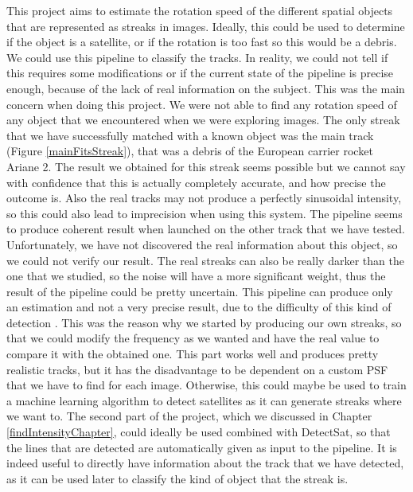 \documentclass[a4paper,12pt,oneside]{report}
\begin{document}
This project aims to estimate the rotation speed of the different spatial objects that are represented as streaks in images. Ideally,
this could be used to determine if the object is a satellite, or if the rotation is too fast so this would be a debris. We could use 
this pipeline to classify the tracks.
\newline
\newline
In reality, we could not tell if this requires some modifications or if the current state of the pipeline is precise enough, because of 
the lack of real information on the subject. This was the main concern when doing this project. We were not able to find any rotation speed of any object that we encountered when we were
exploring images. The only streak that we have successfully matched with a known object was the main track (Figure \ref{mainFitsStreak}),
that was a debris of the European carrier rocket Ariane 2. The result we obtained for this streak seems possible but we cannot say
with confidence that this is actually completely accurate, and how precise the outcome is. Also the real tracks may not produce a perfectly sinusoidal intensity, so this could also lead
to imprecision when using this system. The pipeline seems to produce coherent result when launched on the other track that we have tested.
Unfortunately, we have not discovered the real information about this object, so we could not verify our result.
The real streaks can also be really darker than the one that we studied, so the noise will have a more 
significant weight, thus the result of the pipeline could be pretty uncertain. This pipeline can produce only an estimation and not a very
precise result, due to the difficulty of this kind of detection \cite{GeoSatellite}.
\newline
\newline
This was the reason why we started by producing our own streaks, so that we could modify the frequency as we wanted and have the real
value to compare it with the obtained one. This part works well and produces pretty realistic tracks, but it has the disadvantage to be
dependent on a custom PSF that we have to find for each image. Otherwise, this could maybe be used to train a machine learning algorithm
to detect satellites as it can generate streaks where we want to. 
\newline
\newline
The second part of the project, which we discussed in Chapter \ref{findIntensityChapter}, could ideally be used combined with DetectSat,
so that the lines that are detected are automatically given as input to the pipeline. It is indeed useful to directly have information
about the track that we have detected, as it can be used later to classify the kind of object that the streak is. 
\end{document}
